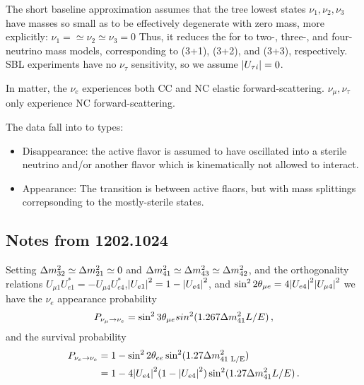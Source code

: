 \documentclass[twocolumn]{article}
\renewcommand{\ne}{\ensuremath{\nu_e}}
\newcommand{\nm}{\ensuremath{\nu_\mu}}
\newcommand{\nt}{\ensuremath{\nu_\tau}}
\newcommand{\nee}{\ensuremath{\nu_e \to \nu_e}}
\newcommand{\nme}{\ensuremath{\nu_\mu \to \nu_e}}
\renewcommand{\th}[1][]{%
  \theta\ifx\\#1\\\else_\text{#1}\fi
}
\newcommand*{\dm}[1][]{%
  \Delta m^2\ifx\\#1\\\else_\text{#1}\fi
}
\begin{document}
The short baseline approximation assumes that the tree lowest states $\nu_1, \nu_2, \nu_3$ have masses so small as to be effectively degenerate with zero mass, more explicitly: $\nu_1 =\simeq \nu_2 \simeq \nu_3 = 0$ Thus, it reduces the for to two-, three-, and four-neutrino mass models, corresponding to (3+1), (3+2), and (3+3), respectively. SBL experiments have no $\nt$ sensitivity, so we assume $\abs{U_{\tau i}} = 0$.

In matter, the $\ne$ experiences both CC and NC elastic forward-scattering. $\nm,\nt$ only experience NC forward-scattering.

The data fall into to types:
\begin{itemize}
  \item Disappearance: the active flavor is assumed to have oscillated into a sterile neutrino and/or another flavor which is kinematically not allowed to interact.
  \item Appearance: The transition is between active flaors, but with mass splittings correpsonding to the mostly-sterile states.
\end{itemize}

\subsection*{Notes from 1202.1024}
Setting $\dm[32] \simeq \dm[21] \simeq 0$ and $\dm[41] \simeq \dm[43] \simeq \dm[42]$, and the orthogonality relations $U_{\mu1} U_{e1}^* = -U_{\mu 4}U_{e4}^*$,$\abs{U_{e1}}^2 = 1-\abs{U_{e4}}^2$, and $\sin^2 2\th_{\mu e} = 4 \abs{U_{e4}}^2 \abs{U_{\mu 4}}^2$ we have the $\ne$ appearance probability
\begin{align*}
  P_{\nme} = \sin^2 3\th_{\mu e} sin^2(1.267\dm[41] L/E)
\,,\end{align*}
and the survival probability
\begin{align*}
  P_{\nee} &= 1- \sin^2 2\th_{ee} \sin^2(1.27 \dm[41 L/E]) \\
           &= 1 - 4\abs{U_{e4}}^2(1- \abs{U_{e4}}^2)\sin^2(1.27\dm[41]L/E)
\,.\end{align*}
\end{document}
